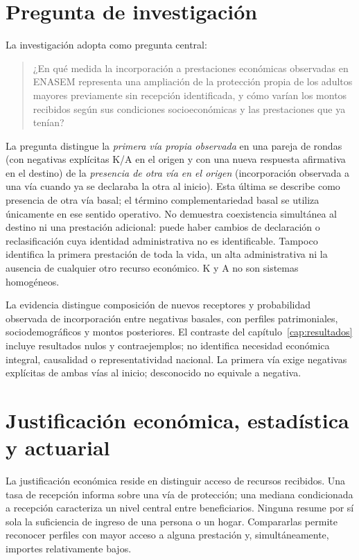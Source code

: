 \section{Pregunta de investigación}

La investigación adopta como pregunta central:

\begin{quote}
¿En qué medida la incorporación a prestaciones económicas observadas en
ENASEM representa una ampliación de la protección propia de los adultos
mayores previamente sin recepción identificada, y cómo varían los montos
recibidos según sus condiciones socioeconómicas y las prestaciones que ya
tenían?
\end{quote}

La pregunta distingue la \emph{primera vía propia observada} en una pareja
de rondas (con negativas explícitas K/A en el origen y con una nueva respuesta
afirmativa en el destino) de la \emph{presencia de otra vía en el origen} (incorporación
observada a una vía cuando ya se declaraba la otra al inicio).
Esta última se describe como presencia de otra vía basal; el término
complementariedad basal se utiliza únicamente en ese sentido operativo. No
demuestra coexistencia simultánea al destino ni una prestación adicional:
puede haber cambios de declaración o reclasificación cuya identidad
administrativa no es identificable. Tampoco identifica
la primera prestación de toda la vida, un alta administrativa ni la ausencia
de cualquier otro recurso económico. K y A no son sistemas homogéneos.

La evidencia distingue composición de nuevos receptores y probabilidad observada de incorporación entre negativas basales, con perfiles patrimoniales, sociodemográficos y montos posteriores. El contraste del capítulo~\ref{cap:resultados} incluye resultados nulos y contraejemplos; no identifica necesidad económica integral, causalidad o representatividad nacional. La primera vía exige negativas explícitas de ambas vías al inicio; desconocido no equivale a negativa.

\section{Justificación económica, estadística y actuarial}

La justificación económica reside en distinguir acceso de recursos recibidos.
Una tasa de recepción informa sobre una vía de protección; una mediana
condicionada a recepción caracteriza un nivel central entre beneficiarios.
Ninguna resume por sí sola la suficiencia de ingreso de una persona o un hogar.
Compararlas permite reconocer perfiles con mayor acceso a alguna prestación
y, simultáneamente, importes relativamente bajos.

